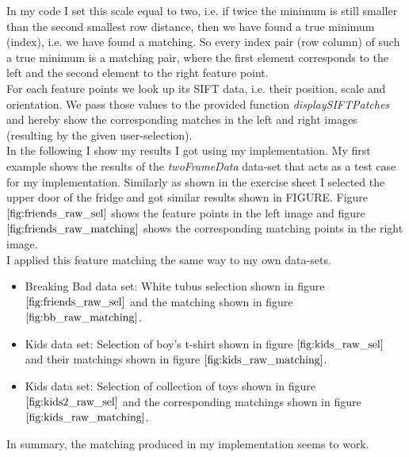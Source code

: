 \documentclass{paper}
\begin{document}
In my code I set this scale equal to two, i.e. if twice the minimum is still smaller than the second smallest row distance, then we have found a true minimum (index), i.e. we have found a matching. So every index pair (row column) of such a true minimum is a matching pair, where the first element corresponds to the left and the second element to the right feature point. \\

For each feature points we look up its SIFT data, i.e. their position, scale and orientation. We pass those values to the provided function \emph{displaySIFTPatches} and hereby show the corresponding matches in the left and right images (resulting by the given user-selection). \\

In the following I show my results I got using my implementation. My first example shows the results of the \emph{twoFrameData} data-set that acts as a test case for my implementation. Similarly as shown in the exercise sheet I selected the upper door of the fridge and got similar results shown in FIGURE. Figure $\ref{fig:friends_raw_sel}$ shows the feature points in the left image and figure $\ref{fig:friends_raw_matching}$ shows the corresponding matching points in the right image. \\

I applied this feature matching the same way to my own data-sets. 

\begin{itemize}
    \item Breaking Bad data set: White tubus selection shown in figure $\ref{fig:friends_raw_sel}$ and the matching shown in figure $\ref{fig:bb_raw_matching}$.
    \item Kids data set: Selection of boy's t-shirt shown in figure $\ref{fig:kids_raw_sel}$ and their matchings shown in figure $\ref{fig:kids_raw_matching}$.
    \item Kids data set: Selection of collection of toys shown in figure $\ref{fig:kids2_raw_sel}$ and the corresponding matchings shown in figure $\ref{fig:kids_raw_matching}$.
\end{itemize}

In summary, the matching produced in my implementation seems to work.
\end{document}
